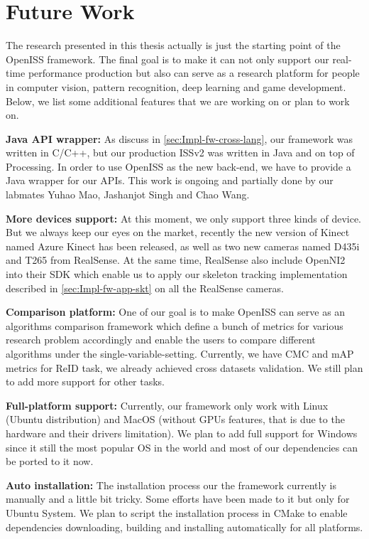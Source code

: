 \section{Future Work}
\label{sec:Conclusion-future-work}

The research presented in this thesis actually is just the starting point of
the OpenISS framework. The final goal is to make it can not only support our
real-time performance production but also can serve as a research platform for
people in computer vision, pattern recognition, deep learning and game
development. Below, we list some additional features that we are working on or
plan to work on.

\textbf{Java API wrapper:} As discuss in \autoref{sec:Impl-fw-cross-lang}, our
framework was written in C/C++, but our production ISSv2 was written in Java
and on top of Processing. In order to use OpenISS as the new back-end, we have
to provide a Java wrapper for our APIs. This work is ongoing and partially done
by our labmates Yuhao Mao, Jashanjot Singh and Chao Wang.

\textbf{More devices support:} At this moment, we only support three kinds of
device. But we always keep our eyes on the market, recently the new version of
Kinect named Azure Kinect has been released, as well as two new cameras named
D435i and T265 from RealSense.
At the same time, RealSense also include OpenNI2 into their SDK which enable us
to apply our skeleton tracking implementation described in
\autoref{sec:Impl-fw-app-skt} on all the RealSense cameras.

\textbf{Comparison platform: } One of our goal is to make OpenISS can serve as
an algorithms comparison framework which define a bunch of metrics for various
research problem accordingly and enable the users to compare different
algorithms under the single-variable-setting. Currently, we have CMC and mAP
metrics for ReID task, we already achieved cross datasets validation. We still
plan to add more support for other tasks.

\textbf{Full-platform support:} Currently, our framework only work with Linux
(Ubuntu distribution) and MacOS (without GPUs features, that is due to the
hardware and their drivers limitation). We plan to add full support for Windows
since it still the most popular OS in the world and most of our dependencies
can be ported to it now.

\textbf{Auto installation:} The installation process our the framework
currently is manually and a little bit tricky. Some efforts have been made to
it but only for Ubuntu System. We plan to script the installation process in
CMake to enable dependencies downloading, building and installing automatically
for all platforms.



